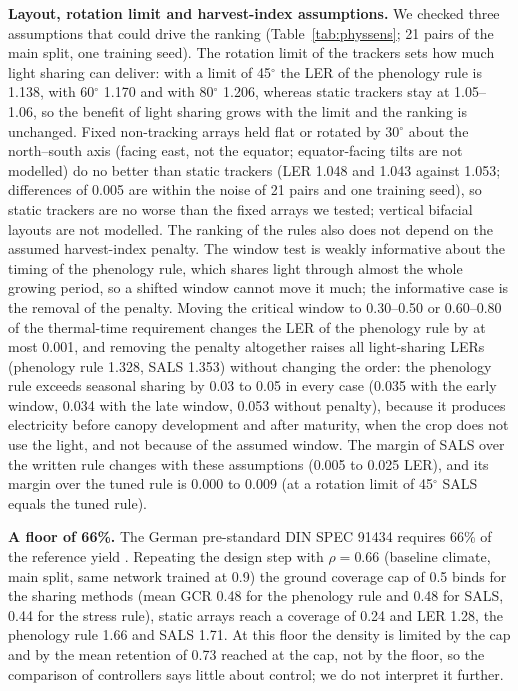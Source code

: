 \textbf{Layout, rotation limit and harvest-index assumptions.} We checked three assumptions that could drive the ranking (Table~\ref{tab:physsens}; 21 pairs of the main split, one training seed). The rotation limit of the trackers sets how much light sharing can deliver: with a limit of 45$^\circ$ the LER of the phenology rule is 1.138, with 60$^\circ$ 1.170 and with 80$^\circ$ 1.206, whereas static trackers stay at 1.05--1.06, so the benefit of light sharing grows with the limit and the ranking is unchanged. Fixed non-tracking arrays held flat or rotated by 30$^\circ$ about the north--south axis (facing east, not the equator; equator-facing tilts are not modelled) do no better than static trackers (LER 1.048 and 1.043 against 1.053; differences of 0.005 are within the noise of 21 pairs and one training seed), so static trackers are no worse than the fixed arrays we tested; vertical bifacial layouts are not modelled. The ranking of the rules also does not depend on the assumed harvest-index penalty. The window test is weakly informative about the timing of the phenology rule, which shares light through almost the whole growing period, so a shifted window cannot move it much; the informative case is the removal of the penalty. Moving the critical window to 0.30--0.50 or 0.60--0.80 of the thermal-time requirement changes the LER of the phenology rule by at most 0.001, and removing the penalty altogether raises all light-sharing LERs (phenology rule 1.328, SALS 1.353) without changing the order: the phenology rule exceeds seasonal sharing by 0.03 to 0.05 in every case (0.035 with the early window, 0.034 with the late window, 0.053 without penalty), because it produces electricity before canopy development and after maturity, when the crop does not use the light, and not because of the assumed window. The margin of SALS over the written rule changes with these assumptions (0.005 to 0.025 LER), and its margin over the tuned rule is 0.000 to 0.009 (at a rotation limit of 45$^\circ$ SALS equals the tuned rule).



\textbf{A floor of 66\%.} The German pre-standard DIN SPEC 91434 requires 66\% of the reference yield \citep{din2021}. Repeating the design step with $\rho=0.66$ (baseline climate, main split, same network trained at 0.9) the ground coverage cap of 0.5 binds for the sharing methods (mean GCR 0.48 for the phenology rule and 0.48 for SALS, 0.44 for the stress rule), static arrays reach a coverage of 0.24 and LER 1.28, the phenology rule 1.66 and SALS 1.71. At this floor the density is limited by the cap and by the mean retention of 0.73 reached at the cap, not by the floor, so the comparison of controllers says little about control; we do not interpret it further.

